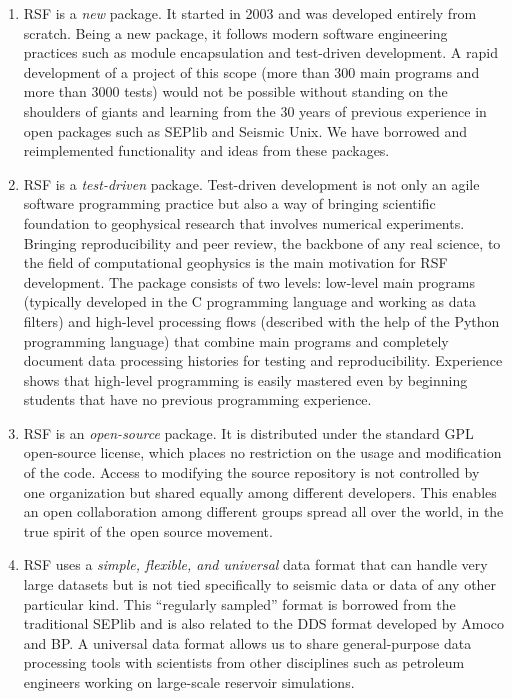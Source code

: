 \begin{enumerate}

\item RSF is a \emph{new} package. It started in 2003 and was
developed entirely from scratch. Being a new package, it follows
modern software engineering practices such as module encapsulation and
test-driven development. A rapid development of a project of this
scope (more than 300 main programs and more than 3000 tests) would not
be possible without standing on the shoulders of giants and learning
from the 30 years of previous experience in open packages such as
SEPlib and Seismic Unix. We have borrowed and reimplemented
functionality and ideas from these packages.

\item RSF is a \emph{test-driven} package. Test-driven development is
not only an agile software programming practice but also a way of
bringing scientific foundation to geophysical research that involves
numerical experiments. Bringing reproducibility and peer review, the
backbone of any real science, to the field of computational geophysics
is the main motivation for RSF development. The package consists of
two levels: low-level main programs (typically developed in the C
programming language and working as data filters) and high-level
processing flows (described with the help of the Python programming
language) that combine main programs and completely document data
processing histories for testing and reproducibility. Experience
shows that high-level programming is easily mastered even by beginning
students that have no previous programming experience.

\item RSF is an \emph{open-source} package. It is distributed under
the standard GPL open-source license, which places no restriction on
the usage and modification of the code. Access to modifying the source
repository is not controlled by one organization but shared equally
among different developers. This enables an open collaboration among
different groups spread all over the world, in the true spirit of the
open source movement.

\item RSF uses a \emph{simple, flexible, and universal} data format
that can handle very large datasets but is not tied specifically to
seismic data or data of any other particular kind. This ``regularly
sampled'' format is borrowed from the traditional SEPlib and is also
related to the DDS format developed by Amoco and BP. A universal data
format allows us to share general-purpose data processing tools with
scientists from other disciplines such as petroleum engineers working
on large-scale reservoir simulations.

\end{enumerate}